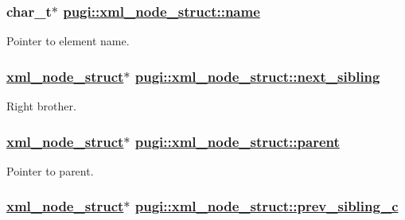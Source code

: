 \hypertarget{structpugi_1_1xml__node__struct_e2324fdbd1e307fb12007d1d0f957a0b}{
\subsubsection[name]{\setlength{\rightskip}{0pt plus 5cm}char\_\-t$\ast$ \hyperlink{structpugi_1_1xml__node__struct_e2324fdbd1e307fb12007d1d0f957a0b}{pugi::xml\_\-node\_\-struct::name}}}
\label{structpugi_1_1xml__node__struct_e2324fdbd1e307fb12007d1d0f957a0b}


Pointer to element name. 

\hypertarget{structpugi_1_1xml__node__struct_cf0867e3a77871e37132046d97398a6d}{
\subsubsection[next\_\-sibling]{\setlength{\rightskip}{0pt plus 5cm}\hyperlink{structpugi_1_1xml__node__struct}{xml\_\-node\_\-struct}$\ast$ \hyperlink{structpugi_1_1xml__node__struct_cf0867e3a77871e37132046d97398a6d}{pugi::xml\_\-node\_\-struct::next\_\-sibling}}}
\label{structpugi_1_1xml__node__struct_cf0867e3a77871e37132046d97398a6d}


Right brother. 

\hypertarget{structpugi_1_1xml__node__struct_f692c222bcc5a9f61108cb3ae0b7b5ea}{
\subsubsection[parent]{\setlength{\rightskip}{0pt plus 5cm}\hyperlink{structpugi_1_1xml__node__struct}{xml\_\-node\_\-struct}$\ast$ \hyperlink{structpugi_1_1xml__node__struct_f692c222bcc5a9f61108cb3ae0b7b5ea}{pugi::xml\_\-node\_\-struct::parent}}}
\label{structpugi_1_1xml__node__struct_f692c222bcc5a9f61108cb3ae0b7b5ea}


Pointer to parent. 

\hypertarget{structpugi_1_1xml__node__struct_74e62128c88c422c0ed969633bbb2d4e}{
\subsubsection[prev\_\-sibling\_\-c]{\setlength{\rightskip}{0pt plus 5cm}\hyperlink{structpugi_1_1xml__node__struct}{xml\_\-node\_\-struct}$\ast$ \hyperlink{structpugi_1_1xml__node__struct_74e62128c88c422c0ed969633bbb2d4e}{pugi::xml\_\-node\_\-struct::prev\_\-sibling\_\-c}}}
\label{structpugi_1_1xml__node__struct_74e62128c88c422c0ed969633bbb2d4e}


